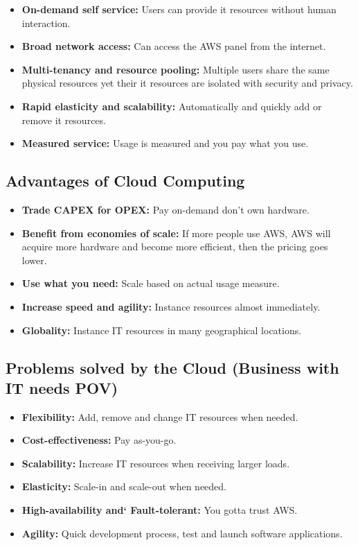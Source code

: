 \begin{itemize}
	\item \textbf{On-demand self service:} Users can provide it resources without human interaction.
	\item \textbf{Broad network access:} Can access the AWS panel from the internet.
	\item \textbf{Multi-tenancy and resource pooling:} Multiple users share the same physical resources yet their it resources are isolated with security and privacy.
	\item \textbf{Rapid elasticity and scalability:} Automatically and quickly add or remove it resources.
	\item \textbf{Measured service:} Usage is measured and you pay what you use.
\end{itemize}

\subsection{Advantages of Cloud Computing}\label{subsec:advantages-of-cloud-computing}

\begin{itemize}
	\item \textbf{Trade CAPEX for OPEX:} Pay on-demand don't own hardware.
	\item \textbf{Benefit from economies of scale:} If more people use AWS, AWS will acquire more hardware and become more efficient, then the pricing goes lower.
	\item \textbf{Use what you need:} Scale based on actual usage measure.
	\item \textbf{Increase speed and agility:} Instance resources almost immediately.
	\item \textbf{Globality:} Instance IT resources in many geographical locations.
\end{itemize}

\subsection{Problems solved by the Cloud (Business with IT needs POV)}\label{subsec:problems-solved-by-the-cloud-(business-with-it-needs-pov)}
\begin{itemize}
	\item \textbf{Flexibility:} Add, remove and change IT resources when needed.
	\item \textbf{Cost-effectiveness:} Pay as-you-go.
	\item \textbf{Scalability:} Increase IT resources when receiving larger loads.
	\item \textbf{Elasticity:} Scale-in and scale-out when needed.
	\item \textbf{High-availability and` Fault-tolerant:} You gotta trust AWS.
	\item \textbf{Agility:} Quick development process, test and launch software applications.
\end{itemize}


